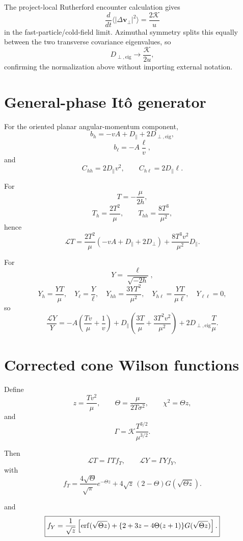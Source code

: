 \documentclass[11pt]{article}
\theoremstyle{remark}
\newcommand{\1}{\mathbf 1}
\begin{document}
The project-local Rutherford encounter calculation gives
\[
\frac{d}{dt}
\langle|\Delta\bm v_\perp|^2\rangle
=
\frac{2\mathcal K}{u}
\]
in the fast-particle/cold-field limit.  Azimuthal symmetry splits this equally
between the two transverse covariance eigenvalues, so
\[
D_{\perp,\mathrm{eig}}
\to
\frac{\mathcal K}{2u},
\]
confirming the normalization above without importing external notation.

\section{General-phase It\^o generator}

For the oriented planar angular-momentum component,
\[
b_h=-vA+D_\parallel+2D_{\perp,\mathrm{eig}},
\]
\[
b_\ell=-A\frac{\ell}{v},
\]
and
\[
C_{hh}=2D_\parallel v^2,
\qquad
C_{h\ell}=2D_\parallel\ell.
\]

For
\[
T=-\frac{\mu}{2h},
\]
\[
T_h=\frac{2T^2}{\mu},
\qquad
T_{hh}=\frac{8T^3}{\mu^2},
\]
hence
\[
\boxed{
\mathcal LT
=
\frac{2T^2}{\mu}
(-vA+D_\parallel+2D_\perp)
+
\frac{8T^3v^2}{\mu^2}D_\parallel.
}
\]

For
\[
Y=\frac{\ell}{\sqrt{-2h}},
\]
\[
Y_h=\frac{YT}{\mu},
\quad
Y_\ell=\frac{Y}{\ell},
\quad
Y_{hh}=\frac{3YT^2}{\mu^2},
\quad
Y_{h\ell}=\frac{YT}{\mu\ell},
\quad
Y_{\ell\ell}=0,
\]
so
\[
\boxed{
\frac{\mathcal LY}{Y}
=
-A\left(\frac{Tv}{\mu}+\frac1v\right)
+
D_\parallel
\left(
\frac{3T}{\mu}
+
\frac{3T^2v^2}{\mu^2}
\right)
+
2D_{\perp,\mathrm{eig}}\frac{T}{\mu}.
}
\]

\section{Corrected cone Wilson functions}

Define
\[
z=\frac{Tv^2}{\mu},
\qquad
\Theta=\frac{\mu}{2T\sigma^2},
\qquad
\chi^2=\Theta z,
\]
and
\[
\Gamma
=
\mathcal K\frac{T^{3/2}}{\mu^{3/2}}.
\]

Then
\[
\mathcal LT=\Gamma T f_T,
\qquad
\mathcal LY=\Gamma Y f_Y,
\]
with
\begin{equation}
\boxed{
f_T
=
\frac{4\sqrt\Theta}{\sqrt\pi}e^{-\Theta z}
+
4\sqrt z\,(2-\Theta)G(\sqrt{\Theta z}).
}
\label{eq:fTcorr}
\end{equation}

and
\begin{equation}
\boxed{
f_Y
=
\frac1{\sqrt z}
\left[
\erf(\sqrt{\Theta z})
+
\{2+3z-4\Theta(z+1)\}
G(\sqrt{\Theta z})
\right].
}
\label{eq:fYcorr}
\end{equation}
\end{document}
